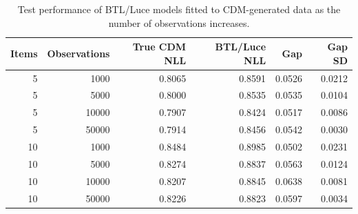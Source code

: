\begin{table}[htbp]
\caption{Test performance of BTL/Luce models fitted to CDM-generated data as the number of observations increases.}
\label{tab:cdm-btl-observation-scaling}
\begin{tabular}{rrrrrr}
\toprule
Items & Observations & True CDM NLL & BTL/Luce NLL & Gap & Gap SD \\
\midrule
5 & 1000 & 0.8065 & 0.8591 & 0.0526 & 0.0212 \\
5 & 5000 & 0.8000 & 0.8535 & 0.0535 & 0.0104 \\
5 & 10000 & 0.7907 & 0.8424 & 0.0517 & 0.0086 \\
5 & 50000 & 0.7914 & 0.8456 & 0.0542 & 0.0030 \\
10 & 1000 & 0.8484 & 0.8985 & 0.0502 & 0.0231 \\
10 & 5000 & 0.8274 & 0.8837 & 0.0563 & 0.0124 \\
10 & 10000 & 0.8207 & 0.8845 & 0.0638 & 0.0081 \\
10 & 50000 & 0.8226 & 0.8823 & 0.0597 & 0.0034 \\
\bottomrule
\end{tabular}
\end{table}
